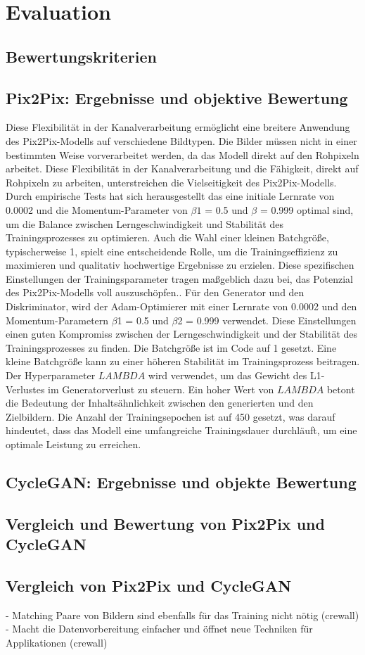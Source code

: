 \chapter{Evaluation}
\section{Bewertungskriterien}
\section{Pix2Pix: Ergebnisse und objektive Bewertung}
 Diese Flexibilität in der Kanalverarbeitung ermöglicht eine breitere Anwendung des Pix2Pix-Modells auf verschiedene Bildtypen. Die Bilder müssen nicht in einer bestimmten Weise vorverarbeitet werden, da das Modell direkt auf den Rohpixeln arbeitet. Diese Flexibilität in der Kanalverarbeitung und die Fähigkeit, direkt auf Rohpixeln zu arbeiten, unterstreichen die Vielseitigkeit des Pix2Pix-Modells.
  Durch empirische Tests hat sich herausgestellt das eine initiale Lernrate von 0.0002 und die Momentum-Parameter von $\beta1$ = 0.5 und $\beta$ = 0.999 optimal sind, um die Balance zwischen Lerngeschwindigkeit und Stabilität des Trainingsprozesses zu optimieren. Auch die Wahl einer kleinen Batchgröße, typischerweise 1, spielt eine entscheidende Rolle, um die Trainingseffizienz zu maximieren und qualitativ hochwertige Ergebnisse zu erzielen. Diese spezifischen Einstellungen der Trainingsparameter tragen maßgeblich dazu bei, das Potenzial des Pix2Pix-Modells voll auszuschöpfen.\cite{PhillipIsola.}.\newline
  Für den Generator und den Diskriminator, wird der Adam-Optimierer mit einer Lernrate von 0.0002 und den Momentum-Parametern $\beta$1 = 0.5 und $\beta$2 = 0.999 verwendet. Diese Einstellungen einen guten Kompromiss zwischen der Lerngeschwindigkeit und der Stabilität des Trainingsprozesses zu finden. Die Batchgröße ist im Code auf 1 gesetzt. Eine kleine Batchgröße kann zu einer höheren Stabilität im Trainingsprozess beitragen. Der Hyperparameter $LAMBDA$ wird verwendet, um das Gewicht des L1-Verlustes im Generatorverlust zu steuern. Ein hoher Wert von $LAMBDA$ betont die Bedeutung der Inhaltsähnlichkeit zwischen den generierten und den Zielbildern. Die Anzahl der Trainingsepochen ist auf 450 gesetzt, was darauf hindeutet, dass das Modell eine umfangreiche Trainingsdauer durchläuft, um eine optimale Leistung zu erreichen.
\section{CycleGAN: Ergebnisse und objekte Bewertung}
\section{Vergleich und Bewertung von Pix2Pix und CycleGAN}
\section{Vergleich von Pix2Pix und CycleGAN}
- Matching Paare von Bildern sind ebenfalls für das Training nicht nötig (crewall)
- Macht die Datenvorbereitung einfacher und öffnet neue Techniken für Applikationen (crewall)